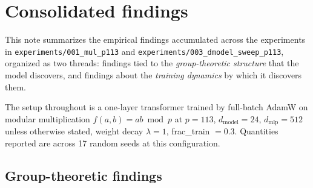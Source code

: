 \section{Consolidated findings}
\label{sec:findings}

This note summarizes the empirical findings accumulated across the
experiments in \texttt{experiments/001\_mul\_p113} and
\texttt{experiments/003\_dmodel\_sweep\_p113}, organized as two threads:
findings tied to the \emph{group-theoretic structure} that the model
discovers, and findings about the \emph{training dynamics} by which it
discovers them.

The setup throughout is a one-layer transformer trained by full-batch
AdamW on modular multiplication $f(a, b) = ab \bmod p$ at $p = 113$,
$d_{\text{model}} = 24$, $d_{\text{mlp}} = 512$ unless otherwise stated,
weight decay $\lambda = 1$, frac\_train $= 0.3$. Quantities reported are
across 17 random seeds at this configuration.

\subsection{Group-theoretic findings}
\label{subsec:findings-grouptheory}

